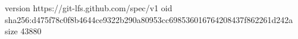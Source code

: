 version https://git-lfs.github.com/spec/v1
oid sha256:d475f78c0f8b4644ce9322b290a80953cc698536016764208437f862261d242a
size 43880
